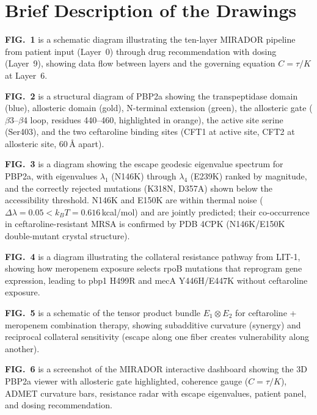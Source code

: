 \documentclass[11pt]{article}
\begin{document}
\section{Brief Description of the Drawings}

\textbf{FIG.~1} is a schematic diagram illustrating the ten-layer MIRADOR pipeline from
patient input (Layer~0) through drug recommendation with dosing (Layer~9), showing data
flow between layers and the governing equation $C = \tau/K$ at Layer~6.

\textbf{FIG.~2} is a structural diagram of PBP2a showing the transpeptidase domain (blue),
allosteric domain (gold), N-terminal extension (green), the allosteric gate
($\beta$3--$\beta$4 loop, residues 440--460, highlighted in orange), the active site serine
(Ser403), and the two ceftaroline binding sites (CFT1 at active site, CFT2 at allosteric
site, 60\,\AA{} apart).

\textbf{FIG.~3} is a diagram showing the escape geodesic eigenvalue spectrum for PBP2a,
with eigenvalues $\lambda_1$ (N146K) through $\lambda_4$ (E239K) ranked by magnitude, and
the correctly rejected mutations (K318N, D357A) shown below the accessibility threshold.
N146K and E150K are within thermal noise ($\Delta\lambda = 0.05 < k_BT = 0.616$\,kcal/mol)
and are jointly predicted; their co-occurrence in ceftaroline-resistant MRSA is confirmed
by PDB 4CPK (N146K/E150K double-mutant crystal structure).

\textbf{FIG.~4} is a diagram illustrating the collateral resistance pathway from
LIT-1, showing how meropenem exposure selects rpoB mutations that reprogram gene expression,
leading to pbp1 H499R and mecA Y446H/E447K without ceftaroline exposure.

\textbf{FIG.~5} is a schematic of the tensor product bundle $E_1 \otimes E_2$ for
ceftaroline + meropenem combination therapy, showing subadditive curvature (synergy) and
reciprocal collateral sensitivity (escape along one fiber creates vulnerability along
another).

\textbf{FIG.~6} is a screenshot of the MIRADOR interactive dashboard showing the 3D PBP2a
viewer with allosteric gate highlighted, coherence gauge ($C = \tau/K$), ADMET curvature
bars, resistance radar with escape eigenvalues, patient panel, and dosing recommendation.

\end{document}
